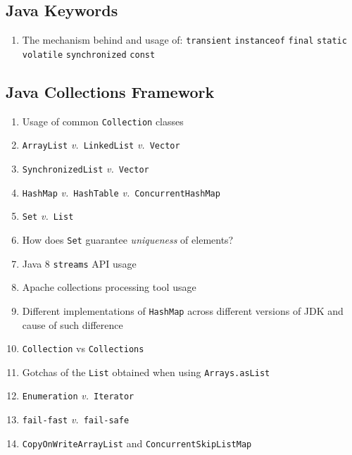 \documentclass[11pt, twocolumn]{article}
\newcommand{\versus}{\textit{v.}\ }
\begin{document}
\subsection{Java Keywords}
\begin{enumerate}
	\item The mechanism behind and usage of:
	\subitem \texttt{transient}
	\subitem \texttt{instanceof}
	\subitem \texttt{final}
	\subitem \texttt{static}
	\subitem \texttt{volatile}
	\subitem \texttt{synchronized}
	\subitem \texttt{const}
\end{enumerate}

\subsection{Java Collections Framework}
\begin{enumerate}
	\item Usage of common \texttt{Collection} classes
	\item \texttt{ArrayList} \versus \texttt{LinkedList} \versus \texttt{Vector}
	\item \texttt{SynchronizedList} \versus \texttt{Vector}
	\item \texttt{HashMap} \versus \texttt{HashTable} \versus \texttt{ConcurrentHashMap}
	\item \texttt{Set} \versus \texttt{List}
	\item How does \texttt{Set} guarantee \textit{uniqueness} of elements?
	\item Java 8 \texttt{streams} API usage
	\item Apache collections processing tool usage
	\item Different implementations of \texttt{HashMap} across different versions of JDK and cause of such difference
	\item \texttt{Collection} vs \texttt{Collections}
	\item Gotchas of the \texttt{List} obtained when using \texttt{Arrays.asList}
	\item \texttt{Enumeration} \versus \texttt{Iterator}
	\item \texttt{fail-fast} \versus \texttt{fail-safe}
	\item \texttt{CopyOnWriteArrayList} and \texttt{ConcurrentSkipListMap}
\end{enumerate}
\end{document}
